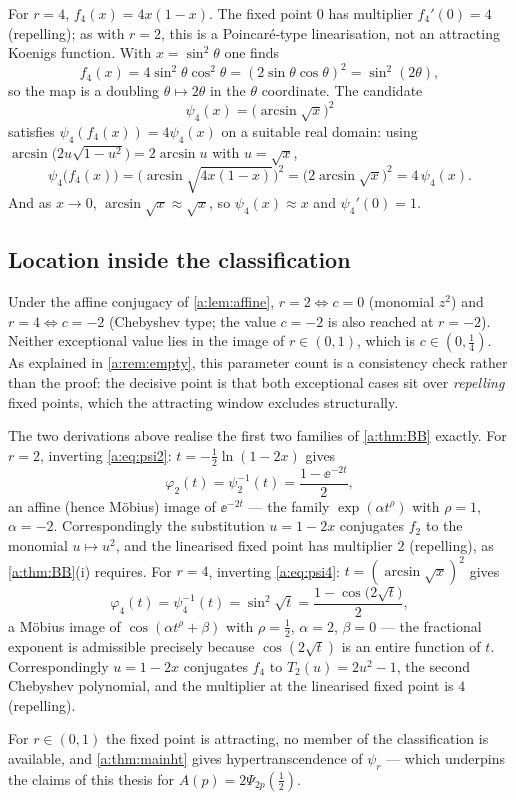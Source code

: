 For $r=4$, $f_4(x)=4x(1-x)$. The fixed point $0$ has multiplier $f_4'(0)=4$
(repelling); as with $r=2$, this is a Poincar\'e-type linearisation, not an
attracting Koenigs function. With $x=\sin^2\theta$ one finds
\begin{equation*}
f_4(x) = 4\sin^2\theta\cos^2\theta = (2\sin\theta\cos\theta)^2 = \sin^2(2\theta),
\end{equation*}
so the map is a doubling $\theta\mapsto2\theta$ in the $\theta$ coordinate. The
candidate
\begin{equation}
\label{a:eq:psi4}
\psi_4(x) = \bigl(\arcsin\sqrt{x}\bigr)^2
\end{equation}
satisfies $\psi_4(f_4(x))=4\psi_4(x)$ on a suitable real domain: using
$\arcsin\bigl(2u\sqrt{1-u^2}\bigr)=2\arcsin u$ with $u=\sqrt{x}$,
\begin{equation*}
\psi_4\bigl(f_4(x)\bigr)
= \bigl(\arcsin\sqrt{4x(1-x)}\bigr)^2
= \bigl(2\arcsin\sqrt{x}\bigr)^2
= 4\,\psi_4(x) .
\end{equation*}
And as $x\to0$, $\arcsin\sqrt{x}\approx\sqrt{x}$, so $\psi_4(x)\approx x$ and
$\psi_4'(0)=1$.

\subsection{Location inside the classification}
\label{a:app:location}

Under the affine conjugacy of \cref{a:lem:affine}, $r=2\Leftrightarrow c=0$
(monomial $z^2$) and $r=4\Leftrightarrow c=-2$ (Chebyshev type; the value $c=-2$
is also reached at $r=-2$). Neither exceptional value lies in the image of
$r\in(0,1)$, which is $c\in(0,\tfrac14)$. As explained in \cref{a:rem:empty},
this parameter count is a consistency check rather than the proof: the decisive
point is that both exceptional cases sit over \emph{repelling} fixed points, which
the attracting window excludes structurally.

The two derivations above realise the first two families of \cref{a:thm:BB}
exactly. For $r=2$, inverting \cref{a:eq:psi2}: $t=-\tfrac12\ln(1-2x)$ gives
\begin{equation*}
\varphi_2(t) = \psi_2^{-1}(t) = \frac{1-\ee^{-2t}}{2},
\end{equation*}
an affine (hence M\"obius) image of $\ee^{-2t}$ --- the family
$\exp(\alpha t^{\rho})$ with $\rho=1$, $\alpha=-2$. Correspondingly the
substitution $u=1-2x$ conjugates $f_2$ to the monomial $u\mapsto u^2$, and the
linearised fixed point has multiplier $2$ (repelling), as \cref{a:thm:BB}(i)
requires. For $r=4$, inverting \cref{a:eq:psi4}: $t=(\arcsin\sqrt{x})^2$ gives
\begin{equation*}
\varphi_4(t) = \psi_4^{-1}(t) = \sin^2\!\sqrt{t}
= \frac{1-\cos\bigl(2\sqrt{t}\bigr)}{2},
\end{equation*}
a M\"obius image of $\cos(\alpha t^{\rho}+\beta)$ with $\rho=\tfrac12$,
$\alpha=2$, $\beta=0$ --- the fractional exponent is admissible precisely because
$\cos(2\sqrt{t})$ is an entire function of $t$. Correspondingly $u=1-2x$ conjugates
$f_4$ to $T_2(u)=2u^2-1$, the second Chebyshev polynomial, and the multiplier at
the linearised fixed point is $4$ (repelling).

For $r\in(0,1)$ the fixed point is attracting, no member of the classification is
available, and \cref{a:thm:mainht} gives hypertranscendence of $\psi_r$ --- which
underpins the claims of this thesis for $A(p)=2\Psi_{2p}(\tfrac12)$.
